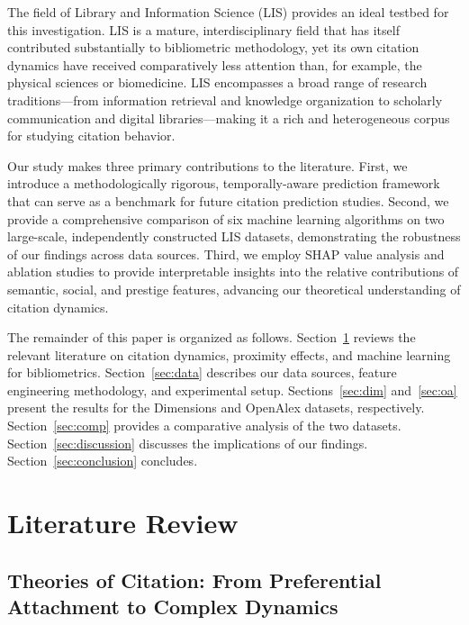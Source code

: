 \documentclass[12pt,a4paper]{article}
\begin{document}
The field of Library and Information Science (LIS) provides an ideal testbed for this investigation. LIS is a mature, interdisciplinary field that has itself contributed substantially to bibliometric methodology, yet its own citation dynamics have received comparatively less attention than, for example, the physical sciences or biomedicine. LIS encompasses a broad range of research traditions---from information retrieval and knowledge organization to scholarly communication and digital libraries---making it a rich and heterogeneous corpus for studying citation behavior.

Our study makes three primary contributions to the literature. First, we introduce a methodologically rigorous, temporally-aware prediction framework that can serve as a benchmark for future citation prediction studies. Second, we provide a comprehensive comparison of six machine learning algorithms on two large-scale, independently constructed LIS datasets, demonstrating the robustness of our findings across data sources. Third, we employ SHAP value analysis and ablation studies to provide interpretable insights into the relative contributions of semantic, social, and prestige features, advancing our theoretical understanding of citation dynamics.

The remainder of this paper is organized as follows. Section~\ref{sec:litreview} reviews the relevant literature on citation dynamics, proximity effects, and machine learning for bibliometrics. Section~\ref{sec:data} describes our data sources, feature engineering methodology, and experimental setup. Sections~\ref{sec:dim} and~\ref{sec:oa} present the results for the Dimensions and OpenAlex datasets, respectively. Section~\ref{sec:comp} provides a comparative analysis of the two datasets. Section~\ref{sec:discussion} discusses the implications of our findings. Section~\ref{sec:conclusion} concludes.

\section{Literature Review}
\label{sec:litreview}

\subsection{Theories of Citation: From Preferential Attachment to Complex Dynamics}
\end{document}
